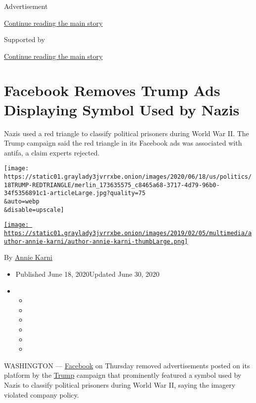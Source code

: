 Advertisement

\protect\hyperlink{after-top}{Continue reading the main story}

Supported by

\protect\hyperlink{after-sponsor}{Continue reading the main story}

\hypertarget{facebook-removes-trump-ads-displaying-symbol-used-by-nazis}{%
\section{Facebook Removes Trump Ads Displaying Symbol Used by
Nazis}\label{facebook-removes-trump-ads-displaying-symbol-used-by-nazis}}

Nazis used a red triangle to classify political prisoners during World
War II. The Trump campaign said the red triangle in its Facebook ads was
associated with antifa, a claim experts rejected.

\texttt{[image: https://static01.graylady3jvrrxbe.onion/images/2020/06/18/us/politics/18TRUMP-REDTRIANGLE/merlin\_173635575\_c8465a68-3717-4d79-96b0-34f5356891c1-articleLarge.jpg?quality=75\\\&auto=webp\\\&disable=upscale]}

\href{https://www.nytimes3xbfgragh.onion/by/annie-karni}{\texttt{[image: https://static01.graylady3jvrrxbe.onion/images/2019/02/05/multimedia/author-annie-karni/author-annie-karni-thumbLarge.png]}}

By \href{https://www.nytimes3xbfgragh.onion/by/annie-karni}{Annie Karni}

\begin{itemize}
\item
  Published June 18, 2020Updated June 30, 2020
\item
  \begin{itemize}
  \item
  \item
  \item
  \item
  \item
  \item
  \end{itemize}
\end{itemize}

WASHINGTON ---
\href{https://www.nytimes3xbfgragh.onion/2020/06/30/us/politics/brad-parscale-trump.html}{Facebook}
on Thursday removed advertisements posted on its platform by the
\href{https://www.nytimes3xbfgragh.onion/2020/06/30/us/politics/brad-parscale-trump.html}{Trump}
campaign that prominently featured a symbol used by Nazis to classify
political prisoners during World War II, saying the imagery violated
company policy.

